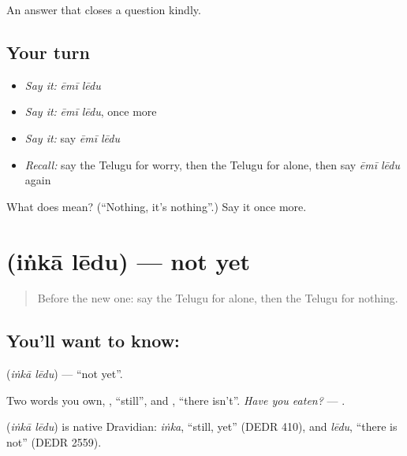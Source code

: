 \begin{grammarlens}[title={What you've built}]
An answer that closes a question kindly.
\end{grammarlens}

\subsection*{Your turn}
\begin{itemize}
\raggedright
  \item \emph{Say it:} \emph{ēmī lēdu}
  \item \emph{Say it:} \emph{ēmī lēdu}, once more
  \item \emph{Say it:} say \emph{ēmī lēdu}
  \item \emph{Recall:} say the Telugu for worry, then the Telugu for alone, then say \emph{ēmī lēdu} again
\end{itemize}

\begin{tcolorbox}[breakable,colback=teal!4,colframe=teal!35!black,title={Before you move on}]
What does   mean? (\textquotedblleft{}Nothing, it's nothing\textquotedblright{}.) Say it once more.
\end{tcolorbox}
\section[\texorpdfstring{\te{ఇంకా} \te{లేదు} (iṅkā lēdu)}{ఇంకా లేదు (iṅkā lēdu)}]{  (iṅkā lēdu) — not yet}

\label{lesson:TE-C98-notyet}



\begin{quote}
Before the new one: say the Telugu for alone, then the Telugu for nothing.
\end{quote}

\subsection*{You'll want to know:  }
\textbf{ } (\emph{iṅkā lēdu}) — \textquotedblleft{}not yet\textquotedblright{}.

Two words you own, \textbf{}, \textquotedblleft{}still\textquotedblright{}, and \textbf{}, \textquotedblleft{}there isn't\textquotedblright{}. \emph{Have you eaten?} — \textbf{ }.

\begin{cousinweb}
\textbf{ } (\emph{iṅkā lēdu}) is native Dravidian: \emph{iṅka}, \textquotedblleft{}still, yet\textquotedblright{} (DEDR 410), and \emph{lēdu}, \textquotedblleft{}there is not\textquotedblright{} (DEDR 2559).
\end{cousinweb}

